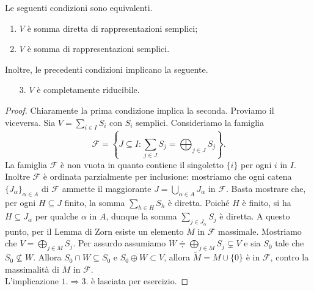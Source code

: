 \begin{proposition}\label{PrSommaSempliciESommaDirettaSemplici} Le seguenti condizioni sono equivalenti.
    \begin{enumerate}
        \item  $V$ è somma diretta di rappresentazioni semplici;
        \item $V$ è somma di rappresentazioni semplici.
    \end{enumerate}
    Inoltre, le precedenti condizioni implicano la seguente.
    \begin{enumerate}
        \item[3.] $V$ è completamente riducibile.
    \end{enumerate}
\end{proposition}
\begin{proof}
    Chiaramente la prima condizione implica la seconda. Proviamo il viceversa. 
    Sia $V=\sum_{i\in I} S_i$ con $S_i$ semplici. Consideriamo la famiglia \[\mathcal{F}=\left\{J\subseteq I    \colon  \sum_{j\in J} S_j = \bigoplus_{j\in J}S_j\right\}.\]
    La famiglia $\mathcal{F}$ è non vuota in quanto contiene il singoletto $\{i\}$ per ogni $i$ in $I$. Inoltre $\mathcal{F}$ è ordinata parzialmente per inclusione: mostriamo che ogni catena $\{J_\alpha\}_{\alpha \in A}$ di $\mathcal{F}$ ammette il maggiorante $J=\bigcup_{\alpha \in A}J_\alpha$ in $\mathcal{F}$. Basta mostrare che, per ogni $H\subseteq J$ finito, la somma $\sum_{h\in H} S_{h}$ è diretta.
    Poiché $H$ è finito, si ha $H\subseteq J_\alpha$ per qualche $\alpha$ in $A$, dunque la somma $\sum_{j\in J_\alpha}S_j$ è diretta. A questo punto, per il Lemma di Zorn esiste un elemento $M$ in $\mathcal{F}$ massimale. Mostriamo che $V=\bigoplus_{j\in M} S_j$. Per assurdo assumiamo $W\doteqdot\bigoplus_{j\in M} S_j\subsetneq V$ e sia $S_0$ tale che $S_0\not\subseteq W$. Allora $S_0\cap W \subseteq S_0$ e $S_0\oplus W \subset V$, allora $\widetilde{M}=M\cup\{0\}$ è in $\mathcal{F}$, contro la massimalità di $M$ in $\mathcal{F}$. \\

    L'implicazione $1. \Rightarrow 3.$ è lasciata per esercizio. 
\end{proof}

